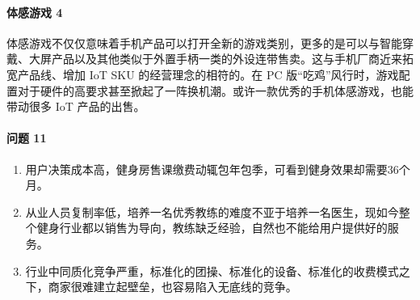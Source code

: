 \documentclass[letterpaper,11pt,english]{sphinxmanual}
\begin{document}
\paragraph{体感游戏 4\sphinxfootnotemark[263]}
\label{\detokenize{chapter_project/AI_fit:id14}}%
\begin{footnotetext}[263]\sphinxAtStartFootnote
{}
%
\end{footnotetext}\ignorespaces 
体感游戏不仅仅意味着手机产品可以打开全新的游戏类别，更多的是可以与智能穿戴、大屏产品以及其他类似于外置手柄一类的外设连带售卖。这与手机厂商近来拓宽产品线、增加
IoT SKU 的经营理念的相符的。在 PC
版“吃鸡”风行时，游戏配置对于硬件的高要求甚至掀起了一阵换机潮。或许一款优秀的手机体感游戏，也能带动很多
IoT 产品的出售。


\paragraph{问题 11\sphinxfootnotemark[264]}
\label{\detokenize{chapter_project/AI_fit:id15}}%
\begin{footnotetext}[264]\sphinxAtStartFootnote
{}
%
\end{footnotetext}\ignorespaces \begin{enumerate}
%
\item {} 
用户决策成本高，健身房售课缴费动辄包年包季，可看到健身效果却需要3\sphinxhyphen{}6个月。

\item {} 
从业人员复制率低，培养一名优秀教练的难度不亚于培养一名医生，现如今整个健身行业都以销售为导向，教练缺乏经验，自然也不能给用户提供好的服务。

\item {} 
行业中同质化竞争严重，标准化的团操、标准化的设备、标准化的收费模式之下，商家很难建立起壁垒，也容易陷入无底线的竞争。

\end{enumerate}
\end{document}
